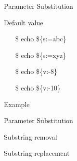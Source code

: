 \begin{frame}{Parameter Substitution}
  \begin{block}{Default value}\ttfamily
    \begin{multicols}{2}
      \begin{itemize}
      \item[\$] echo \$\{s:=abc\}
      \item[\$] echo \$\{s:=xyz\}
      \item[\$] echo \$\{v:-8\}
      \item[\$] echo \$\{v:-10\}
      \end{itemize}
    \end{multicols}
  \end{block}
  \begin{block}{Example}
    \begin{center}
      \begin{center}
      \end{center}
    \end{center}
  \end{block}
\end{frame}

\begin{frame}{Parameter Substitution}
  \begin{block}{Substring removal}
  \end{block}
  \begin{block}{Substring replacement}
  \end{block}  
\end{frame}

